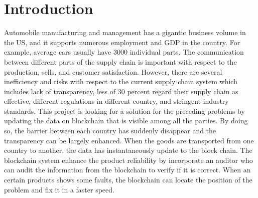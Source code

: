 \documentclass[12pt]{article}
\begin{document}
\section{Introduction}
Automobile manufacturing and management has a gigantic business volume in the US, 
and it supports numerous employment and GDP in the country. For example, average cars 
usually have 3000 individual parts. The communication between different parts of the 
supply chain is important with respect to the production, sells, and customer satisfaction. 
However, there are several inefficiency and risks with respect to the current supply chain 
system which includes lack of transparency\cite{choudhurry_2020}, less of 30 percent 
regard their supply chain as effective, different regulations in different country, 
and stringent industry standards. This project is looking for a solution for the preceding 
problems by updating the data on blockchain that is visible among all the parties. 
By doing so, the barrier between each country has suddenly disappear and the 
transparency can be largely enhanced. 
When the goods are transported from one country to another, the data has 
instantaneously update to the block chain. 
The blockchain system enhance the product reliability by incorporate an 
auditor who can audit the information 
from the blockchain to verify if it is correct. When an certain products 
shows some faults, the blockchain can locate 
the position of the problem and fix it in a faster speed.

%
\end{document}
